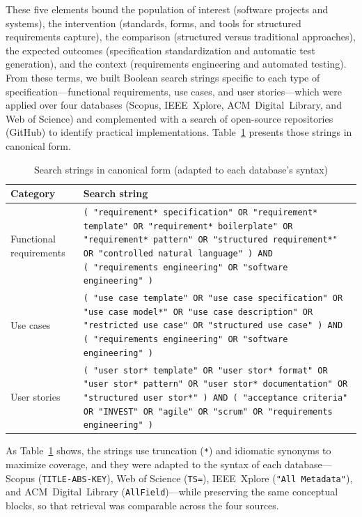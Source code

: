 \documentclass[10pt,journal,twoside,letterpaper]{IEEEtran}
\begin{document}
    These five elements bound the population of interest (software projects and systems), the intervention (standards, forms, and tools for structured requirements capture), the comparison (structured versus traditional approaches), the expected outcomes (specification standardization and automatic test generation), and the context (requirements engineering and automated testing). From these terms, we built Boolean search strings specific to each type of specification---functional requirements, use cases, and user stories---which were applied over four databases (Scopus, IEEE~Xplore, ACM~Digital~Library, and Web of Science) and complemented with a search of open-source repositories (GitHub) to identify practical implementations. Table~\ref{tab:cadenas} presents those strings in canonical form.
    
    \begin{table}[!tb]
        \caption{Search strings in canonical form (adapted to each database's syntax)}
        \label{tab:cadenas}
        \centering
        \footnotesize
        \begin{tabular}{@{}p{}p{}@{}}
            \toprule
            \textbf{Category} & \textbf{Search string} \\
            \midrule
            Functional requirements & \texttt{(\,"requirement* specification" OR "requirement* template" OR "requirement* boilerplate" OR "requirement* pattern" OR "structured requirement*" OR "controlled natural language"\,) AND (\,"requirements engineering" OR "software engineering"\,)} \\
            \addlinespace
            Use cases & \texttt{(\,"use case template" OR "use case specification" OR "use case model*" OR "use case description" OR "restricted use case" OR "structured use case"\,) AND (\,"requirements engineering" OR "software engineering"\,)} \\
            \addlinespace
            User stories & \texttt{(\,"user stor* template" OR "user stor* format" OR "user stor* pattern" OR "user stor* documentation" OR "structured user stor*"\,) AND (\,"acceptance criteria" OR "INVEST" OR "agile" OR "scrum" OR "requirements engineering"\,)} \\
            \bottomrule
        \end{tabular}
    \end{table}
    
    As Table~\ref{tab:cadenas} shows, the strings use truncation (\texttt{*}) and idiomatic synonyms to maximize coverage, and they were adapted to the syntax of each database---Scopus (\texttt{TITLE-ABS-KEY}), Web of Science (\texttt{TS=}), IEEE~Xplore (\texttt{"All Metadata"}), and ACM~Digital~Library (\texttt{AllField})---while preserving the same conceptual blocks, so that retrieval was comparable across the four sources.
    
\end{document}
